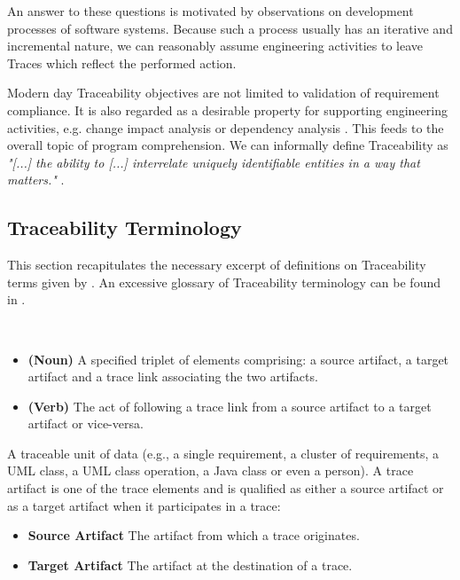 An answer to these questions is motivated by observations on development processes of software systems.
Because such a process usually has an iterative and incremental nature, we can reasonably assume engineering activities to leave \glspl{Trace} which reflect the performed action.

Modern day \gls{Traceability} objectives are not limited to validation of requirement compliance.
It is also regarded as a desirable property for supporting engineering activities, e.g. change impact analysis or dependency analysis \cite{DBLP:books/daglib/p/GotelCHZEGDAMM12} \cite{DBLP:conf/re/GotelF94}.
This feeds to the overall topic of program comprehension.
We can informally define \gls{Traceability} as \textit{"[...] the ability to [...] interrelate uniquely identifiable
entities in a way that matters."} \cite{PaigeOKZPC2010} \cite{DBLP:journals/sosym/WinklerP10}.


\subsection{Traceability Terminology}
\label{subsection:TraceabilityTerminology}
This section recapitulates the necessary excerpt of definitions on \gls{Traceability} terms given by \cite{DBLP:books/daglib/p/GotelCHZEGDAMM12}.
An excessive glossary of \gls{Traceability} terminology can be found in \cite{TraceabilityGlossary}.

\begin{definition}[Trace]
~
\begin{itemize}
\item
\textbf{(Noun)}
A specified triplet of elements comprising: a source artifact, a target artifact and a trace link associating the two artifacts.
\cite{DBLP:books/daglib/p/GotelCHZEGDAMM12}

\item
\textbf{(Verb)}
The act of following a trace link from a source artifact to a target artifact or vice-versa.
\cite{DBLP:books/daglib/p/GotelCHZEGDAMM12}
\end{itemize}
\end{definition}

\begin{definition}
A traceable unit of da\-ta (e.g., a single requirement, a cluster of requirements, a UML class, a UML class operation, a Java class or even a person).
A trace artifact is one of the trace elements and is qualified as either a source artifact or as a target artifact when it participates in a trace:
\begin{itemize}
\item
\textbf{Source Artifact}
The artifact from which a trace originates.
\item
\textbf{Target Artifact}
The artifact at the destination of a trace.
\end{itemize}
\cite{DBLP:books/daglib/p/GotelCHZEGDAMM12}
\end{definition}


